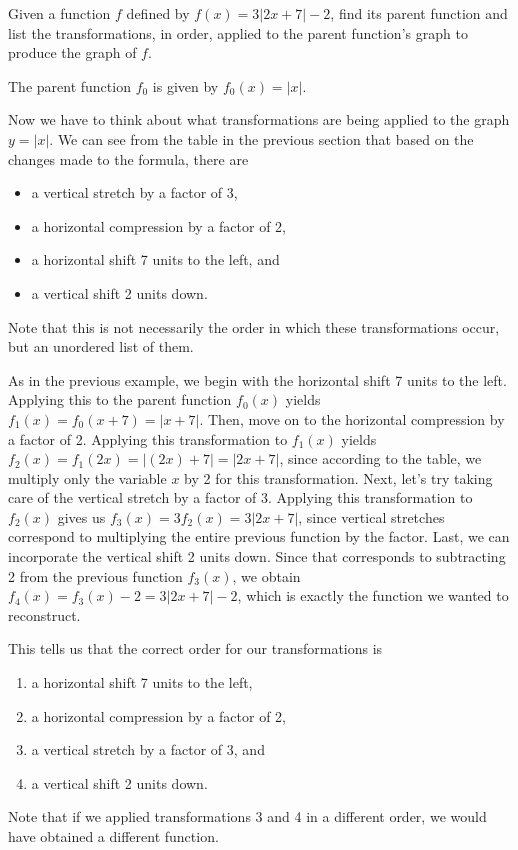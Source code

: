 \documentclass[handout, noauthor, nooutcomes]{ximera}
\begin{document}
\begin{example}
Given a function $f$ defined by $f(x) = 3|2x + 7| - 2$, find its parent function and list the transformations, in order, applied to the parent function's graph to produce the graph of $f$. 
\begin{explanation}
The parent function $f_0$ is given by $f_0(x) = |x|$.

Now we have to think about what transformations are being applied to the graph $y = |x|$. We can see from the table in the previous section that based on the changes made to the formula, there are 
\begin{itemize}
\item a vertical stretch by a factor of 3,
\item a horizontal compression by a factor of 2,
\item a horizontal shift 7 units to the left, and
\item a vertical shift 2 units down.
\end{itemize}
Note that this is not necessarily the order in which these transformations occur, but an unordered list of them. 

As in the previous example, we begin with the horizontal shift 7 units to the left. Applying this to the parent function $f_0(x)$ yields $f_1(x) = f_0(x + 7) = |x + 7|$. Then, move on to the horizontal compression by a factor of 2. Applying this transformation to $f_1(x)$ yields $f_2(x) = f_1(2x) = |(2x) + 7| = |2x + 7|$, since according to the table, we multiply only the variable $x$ by 2 for this transformation. Next, let's try taking care of the vertical stretch by a factor of 3. Applying this transformation to $f_2(x)$ gives us $f_3(x) = 3f_2(x) = 3|2x + 7|$, since vertical stretches correspond to multiplying the entire previous function by the factor. Last, we can incorporate the vertical shift 2 units down. Since that corresponds to subtracting 2 from the previous function $f_3(x)$, we obtain $f_4(x) = f_3(x) - 2 = 3|2x + 7| - 2$, which is exactly the function we wanted to reconstruct. 

This tells us that the correct order for our transformations is 
\begin{enumerate}
\item a horizontal shift 7 units to the left, 
\item a horizontal compression by a factor of 2,
\item a vertical stretch by a factor of 3, and
\item a vertical shift 2 units down.
\end{enumerate}

Note that if we applied transformations 3 and 4 in a different order, we would have obtained a different function.
\end{explanation}
\end{example}
\end{document}
